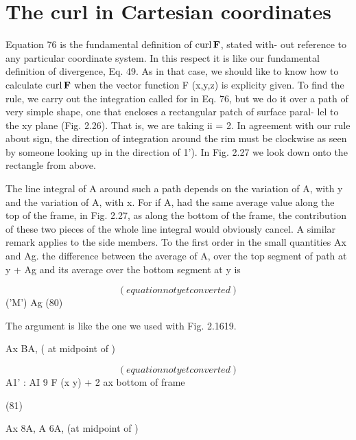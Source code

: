 \section{The curl in Cartesian coordinates}

Equation 76 is the fundamental definition of $\operatorname{curl}\mathbf{F}$, stated with-
out reference to any particular coordinate system. In this respect it
is like our fundamental definition of divergence, Eq. 49. As in that
case, we should like to know how to calculate $\operatorname{curl}\mathbf{F}$ when the vector
function F (x,y,z) is explicity given. To find the rule, we carry out
the integration called for in Eq. 76, but we do it over a path of very
simple shape, one that encloses a rectangular patch of surface paral-
lel to the xy plane (Fig. 2.26). That is, we are taking ii = 2. In
agreement with our rule about sign, the direction of integration
around the rim must be clockwise as seen by someone looking up
in the direction of 1'). In Fig. 2.27 we look down onto the rectangle
from above.

The line integral of A around such a path depends on the variation
of A, with y and the variation of A, with x. For if A, had the same
average value along the top of the frame, in Fig. 2.27, as along the
bottom of the frame, the contribution of these two pieces of the whole
line integral would obviously cancel. A similar remark applies to
the side members. To the first order in the small quantities Ax and
Ag. the difference between the average of A, over the top segment of
path at y + Ag and its average over the bottom segment at y is

\begin{equation}
(equation not yet converted)
\end{equation}
('M') Ag (80)

The argument is like the one we used with Fig. 2.1619.

Ax BA, ( at midpoint of )

\begin{equation}
(equation not yet converted)
\end{equation}
A1' : AI 9 F
(x y) + 2 ax bottom of frame

(81)

Ax 8A, A 6A, (at midpoint of )

